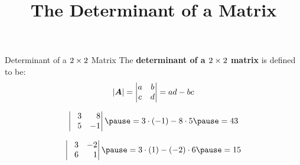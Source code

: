 \documentclass{beamer}
\title[MA178 - Section 5.3]{The Determinant of a Matrix}
\begin{document}
\begin{frame}
  \titlepage
\end{frame}

\begin{frame}
\begin{block}{Determinant of a $2 \times 2$ Matrix}
The \textbf{determinant of a $2 \times 2$ matrix} is defined to be:
\begin{equation*}
{\left\lvert \boldsymbol{A}\right\rvert} = 
\begin{vmatrix}
a & b \\
c & d
\end{vmatrix}
=ad-bc
\end{equation*}
\end{block}\pause
\begin{example}
\begin{equation*}
\begin{vmatrix}
\+3 & \+8\\
\+5 & -1
\end{vmatrix}\pause
=3\cdot (-1) - 8\cdot 5\pause
=43
\end{equation*}
\end{example}\pause
\begin{example}
\begin{equation*}
\begin{vmatrix}
\+3 &  -2\\
\+6 & \+1
\end{vmatrix}\pause
=3\cdot (1) - (-2)\cdot 6\pause
=15
\end{equation*}
\end{example}
\end{frame}
\end{document}
